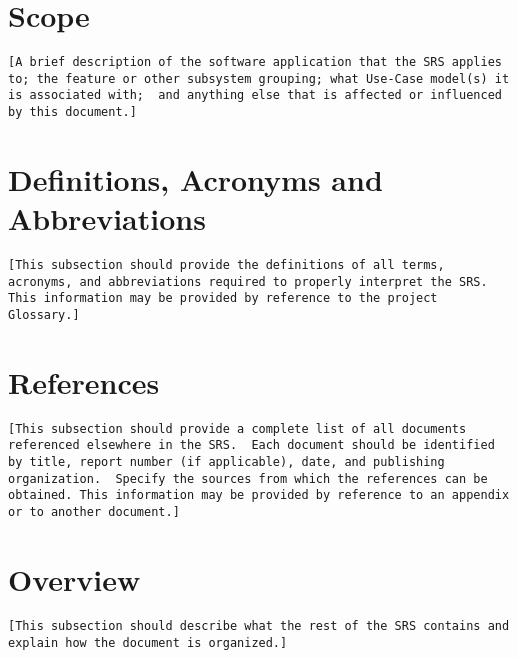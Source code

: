 \documentclass[a4paper,12pt,chapterprefix=false,bibliography=totoc,listof=totoc]{scrreprt}
\begin{document}
\section{Scope}
\begin{verbatim}
[A brief description of the software application that the SRS applies to; the feature or other subsystem grouping; what Use-Case model(s) it is associated with;  and anything else that is affected or influenced by this document.]
\end{verbatim}

\section{Definitions, Acronyms and Abbreviations}
\begin{verbatim}
[This subsection should provide the definitions of all terms, acronyms, and abbreviations required to properly interpret the SRS.  This information may be provided by reference to the project Glossary.]
\end{verbatim}

\section{References}
\begin{verbatim}
[This subsection should provide a complete list of all documents referenced elsewhere in the SRS.  Each document should be identified by title, report number (if applicable), date, and publishing organization.  Specify the sources from which the references can be obtained. This information may be provided by reference to an appendix or to another document.]
\end{verbatim}

\section{Overview}
\begin{verbatim}
[This subsection should describe what the rest of the SRS contains and explain how the document is organized.]
\end{verbatim}
\end{document}

